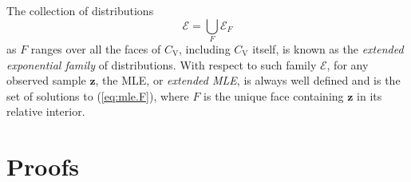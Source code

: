 \documentclass[aos,MSNbibl,nameyear,dvips]{arximspdf}
\newcommand{\m}[1]{\mathrm{#1}}
\newcommand{\bftheta}{\bolds{\theta}}
\newcommand{\eqref}[1]{(\ref{#1})}
\begin{document}
\begin{appendix}

The collection of distributions
%
\[
\mathcal{E} = \bigcup_F \mathcal{E}_F
\]
%
as $F$ ranges over all the faces of $C_{\m{V}}$, including $C_{\m{V}}$
itself, is known as the \textit{extended exponential family} of
distributions. With respect to such family $\mathcal{E}$, for any
observed sample $\mathbf{z}$, the MLE, or \textit{extended MLE}, is
always well defined and is the set of solutions to \eqref{eq:mle.F},
where $F$ is the unique face containing $\mathbf{z}$ in its relative
interior.




\section{Proofs}\label{appendix.proof}


\end{appendix}
\end{document}
